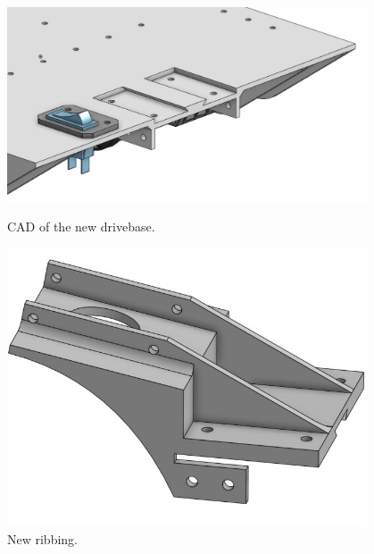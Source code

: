 \begin{figure}[ht]
\centering
\begin{minipage}[b]{.48\textwidth}
  \centering
  \includegraphics[width=0.95\textwidth]{Meetings/October/10-15-21/10-15-21_CAD_Figure1 - Nathan Forrer.JPG}
  \caption{CAD of the new drivebase.}
  \label{fig:pic1}
\end{minipage}%
\hfill%
\begin{minipage}[b]{.48\textwidth}
  \centering
  \includegraphics[width=0.95\textwidth]{Meetings/October/10-15-21/10-15-21_CAD_Figure2 - Nathan Forrer.JPG}
  \caption{New ribbing.}
  \label{fig:pic2}
\end{minipage}
\end{figure}

